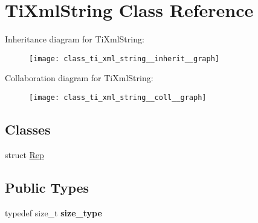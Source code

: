 \hypertarget{class_ti_xml_string}{\section{\-Ti\-Xml\-String \-Class \-Reference}
\label{class_ti_xml_string}
}


\-Inheritance diagram for \-Ti\-Xml\-String\-:\nopagebreak
\begin{figure}[H]
\begin{center}
\leavevmode
\texttt{[image: class\_ti\_xml\_string\_\_inherit\_\_graph]}
\end{center}
\end{figure}


\-Collaboration diagram for \-Ti\-Xml\-String\-:\nopagebreak
\begin{figure}[H]
\begin{center}
\leavevmode
\texttt{[image: class\_ti\_xml\_string\_\_coll\_\_graph]}
\end{center}
\end{figure}
\subsection*{\-Classes}
\begin{DoxyCompactItemize}
\item 
struct \hyperlink{struct_ti_xml_string_1_1_rep}{\-Rep}
\end{DoxyCompactItemize}
\subsection*{\-Public \-Types}
\begin{DoxyCompactItemize}
\item 
\hypertarget{class_ti_xml_string_abeb2c1893a04c17904f7c06546d0b971}{typedef size\-\_\-t {\bfseries size\-\_\-type}}\label{class_ti_xml_string_abeb2c1893a04c17904f7c06546d0b971}

\end{DoxyCompactItemize}
